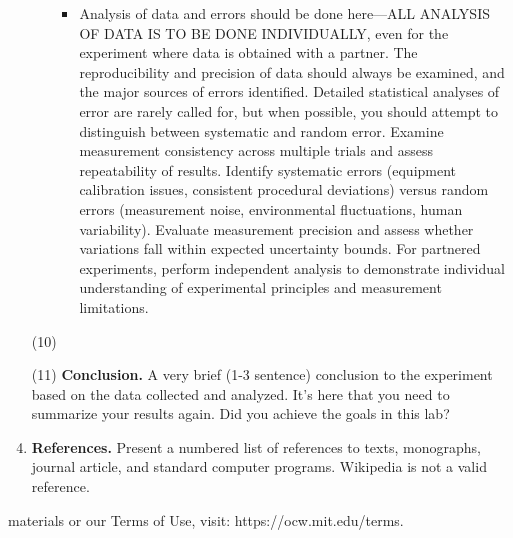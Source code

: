 \documentclass[12pt]{article}
\begin{document}
\begin{enumerate}
\begin{itemize}
\begin{itemize}
\item Analysis of data and errors should be done here—ALL ANALYSIS OF DATA IS TO BE DONE INDIVIDUALLY, even for the experiment where data is obtained with a partner. The reproducibility and precision of data should always be examined, and the major sources of errors identified. Detailed statistical analyses of error are rarely called for, but when possible, you should attempt to distinguish between systematic and random error. Examine measurement consistency across multiple trials and assess repeatability of results. Identify systematic errors (equipment calibration issues, consistent procedural deviations) versus random errors (measurement noise, environmental fluctuations, human variability). Evaluate measurement precision and assess whether variations fall within expected uncertainty bounds. For partnered experiments, perform independent analysis to demonstrate individual understanding of experimental principles and measurement limitations.
\end{itemize}
\end{itemize}

\item[(10)] \quad

\item[(11)] \textbf{Conclusion.} A very brief (1-3 sentence) conclusion to the experiment based on the data collected and analyzed. It's here that you need to summarize your results again. Did you achieve the goals in this lab?

\item \textbf{References.} Present a numbered list of references to texts, monographs, journal article, and standard computer programs. Wikipedia is not a valid reference.

\end{enumerate}

materials or our Terms of Use, visit: https://ocw.mit.edu/terms.
\end{document}
